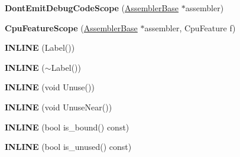\begin{DoxyCompactItemize}
\item 
\hypertarget{classv8_1_1internal_1_1_b_a_s_e___e_m_b_e_d_d_e_d_addd11b8e48d02cd0f0c3ffc479164df7}{}{\bfseries Dont\+Emit\+Debug\+Code\+Scope} (\hyperlink{classv8_1_1internal_1_1_assembler_base}{Assembler\+Base} $\ast$assembler)\label{classv8_1_1internal_1_1_b_a_s_e___e_m_b_e_d_d_e_d_addd11b8e48d02cd0f0c3ffc479164df7}

\item 
\hypertarget{classv8_1_1internal_1_1_b_a_s_e___e_m_b_e_d_d_e_d_af4370e266a511099cb16732746d6b04a}{}{\bfseries Cpu\+Feature\+Scope} (\hyperlink{classv8_1_1internal_1_1_assembler_base}{Assembler\+Base} $\ast$assembler, Cpu\+Feature f)\label{classv8_1_1internal_1_1_b_a_s_e___e_m_b_e_d_d_e_d_af4370e266a511099cb16732746d6b04a}

\item 
\hypertarget{classv8_1_1internal_1_1_b_a_s_e___e_m_b_e_d_d_e_d_a18e1d3f1a56925cad9fca70c3a5710a4}{}{\bfseries I\+N\+L\+I\+N\+E} (Label())\label{classv8_1_1internal_1_1_b_a_s_e___e_m_b_e_d_d_e_d_a18e1d3f1a56925cad9fca70c3a5710a4}

\item 
\hypertarget{classv8_1_1internal_1_1_b_a_s_e___e_m_b_e_d_d_e_d_aa236b757410c690856757ee03f4ca2e2}{}{\bfseries I\+N\+L\+I\+N\+E} ($\sim$Label())\label{classv8_1_1internal_1_1_b_a_s_e___e_m_b_e_d_d_e_d_aa236b757410c690856757ee03f4ca2e2}

\item 
\hypertarget{classv8_1_1internal_1_1_b_a_s_e___e_m_b_e_d_d_e_d_ac72eadcf599fbb1d1877a550b3f86f81}{}{\bfseries I\+N\+L\+I\+N\+E} (void Unuse())\label{classv8_1_1internal_1_1_b_a_s_e___e_m_b_e_d_d_e_d_ac72eadcf599fbb1d1877a550b3f86f81}

\item 
\hypertarget{classv8_1_1internal_1_1_b_a_s_e___e_m_b_e_d_d_e_d_ad3ba4ec7acc4b645efa4ec663d133ee0}{}{\bfseries I\+N\+L\+I\+N\+E} (void Unuse\+Near())\label{classv8_1_1internal_1_1_b_a_s_e___e_m_b_e_d_d_e_d_ad3ba4ec7acc4b645efa4ec663d133ee0}

\item 
\hypertarget{classv8_1_1internal_1_1_b_a_s_e___e_m_b_e_d_d_e_d_a1bfd941cb699dc5e9f796afcec0693d2}{}{\bfseries I\+N\+L\+I\+N\+E} (bool is\+\_\+bound() const)\label{classv8_1_1internal_1_1_b_a_s_e___e_m_b_e_d_d_e_d_a1bfd941cb699dc5e9f796afcec0693d2}

\item 
\hypertarget{classv8_1_1internal_1_1_b_a_s_e___e_m_b_e_d_d_e_d_aa9b517b2df0abd17bf9a33aeca7672ba}{}{\bfseries I\+N\+L\+I\+N\+E} (bool is\+\_\+unused() const)\label{classv8_1_1internal_1_1_b_a_s_e___e_m_b_e_d_d_e_d_aa9b517b2df0abd17bf9a33aeca7672ba}


\end{DoxyCompactItemize}
